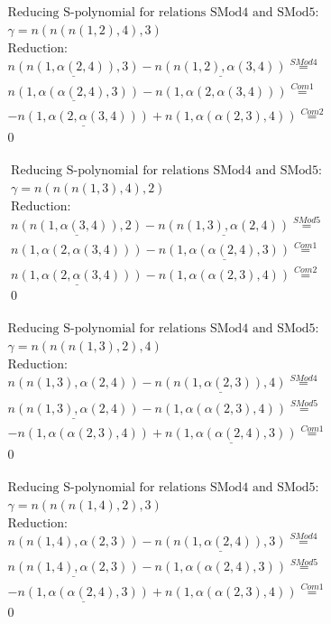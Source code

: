\documentclass[11pt]{amsart}
\begin{document}
\begin{align*} 
& \text{Reducing S-polynomial for relations SMod4 and SMod5:} \\ 
& \gamma = n(n(n(1,2),4),3) \\ 
& \text{Reduction}: \\&\underline{n(n(1,\alpha(2,4)),3)} - \underline{n(n(1,2),\alpha(3,4))} \stackrel{ SMod4 }{=}  \\ 
&\underline{n(1,\alpha(\alpha(2,4),3))} - n(1,\alpha(2,\alpha(3,4))) \stackrel{ Com1 }{=}  \\ 
& - \underline{n(1,\alpha(2,\alpha(3,4)))} + n(1,\alpha(\alpha(2,3),4)) \stackrel{ Com2 }{=}  \\ 
&0\\ 
\end{align*} 
 
\begin{align*} 
& \text{Reducing S-polynomial for relations SMod4 and SMod5:} \\ 
& \gamma = n(n(n(1,3),4),2) \\ 
& \text{Reduction}: \\&\underline{n(n(1,\alpha(3,4)),2)} - \underline{n(n(1,3),\alpha(2,4))} \stackrel{ SMod5 }{=}  \\ 
&n(1,\alpha(2,\alpha(3,4))) - \underline{n(1,\alpha(\alpha(2,4),3))} \stackrel{ Com1 }{=}  \\ 
&\underline{n(1,\alpha(2,\alpha(3,4)))} - n(1,\alpha(\alpha(2,3),4)) \stackrel{ Com2 }{=}  \\ 
&0\\ 
\end{align*} 
 
\begin{align*} 
& \text{Reducing S-polynomial for relations SMod4 and SMod5:} \\ 
& \gamma = n(n(n(1,3),2),4) \\ 
& \text{Reduction}: \\&n(n(1,3),\alpha(2,4)) - \underline{n(n(1,\alpha(2,3)),4)} \stackrel{ SMod4 }{=}  \\ 
&\underline{n(n(1,3),\alpha(2,4))} - n(1,\alpha(\alpha(2,3),4)) \stackrel{ SMod5 }{=}  \\ 
& - n(1,\alpha(\alpha(2,3),4)) + \underline{n(1,\alpha(\alpha(2,4),3))} \stackrel{ Com1 }{=}  \\ 
&0\\ 
\end{align*} 
 
\begin{align*} 
& \text{Reducing S-polynomial for relations SMod4 and SMod5:} \\ 
& \gamma = n(n(n(1,4),2),3) \\ 
& \text{Reduction}: \\&n(n(1,4),\alpha(2,3)) - \underline{n(n(1,\alpha(2,4)),3)} \stackrel{ SMod4 }{=}  \\ 
&\underline{n(n(1,4),\alpha(2,3))} - n(1,\alpha(\alpha(2,4),3)) \stackrel{ SMod5 }{=}  \\ 
& - \underline{n(1,\alpha(\alpha(2,4),3))} + n(1,\alpha(\alpha(2,3),4)) \stackrel{ Com1 }{=}  \\ 
&0\\ 
\end{align*} 
 
\end{document}
